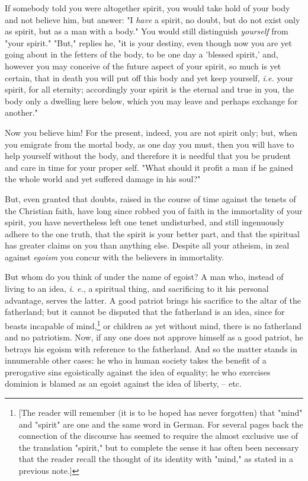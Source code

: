 \documentclass[a4paper]{book}
\begin{document}
If somebody told you were altogether spirit, you would take hold of your body 
and not believe him, but answer: "{}I \textit{have} a spirit, no doubt, but do 
not exist only as spirit, but as a man with a body."{} You would still 
distinguish \textit{yourself} from "{}your spirit."{} "{}But,"{} replies he, 
"{}it is your destiny, even though now you are yet going about in the fetters 
of the body, to be one day a 'blessed spirit,' and, however you may conceive 
of the future aspect of your spirit, so much is yet certain, that in death you 
will put off this body and yet keep yourself, \textit{i.e.} your spirit, for 
all eternity; accordingly your spirit is the eternal and true in you, the body 
only a dwelling here below, which you may leave and perhaps exchange for 
another."{}

Now you believe him! For the present, indeed, you are not spirit only; but, 
when you emigrate from the mortal body, as one day you must, then you will 
have to help yourself without the body, and therefore it is needful that you 
be prudent and care in time for your proper self. "{}What should it profit a 
man if he gained the whole world and yet suffered damage in his soul?"{}

But, even granted that doubts, raised in the course of time against the tenets 
of the Christian faith, have long since robbed you of faith in the immortality 
of your spirit, you have nevertheless left one tenet undisturbed, and still 
ingenuously adhere to the one truth, that the spirit is your better part, and 
that the spiritual has greater claims on you than anything else. Despite all 
your atheism, in zeal against \textit{egoism} you concur with the believers in 
immortality.

But whom do you think of under the name of egoist? A man who, instead of 
living to an idea, \textit{i. e.}, a spiritual thing, and sacrificing to it 
his personal advantage, serves the latter. A good patriot brings his sacrifice 
to the altar of the fatherland; but it cannot be disputed that the fatherland 
is an idea, since for beasts incapable of mind,\footnote{[The reader will 
remember (it is to be hoped has never forgotten) that "{}mind"{} and 
"{}spirit"{} are one and the same word in German. For several pages back the 
connection of the discourse has seemed to require the almost exclusive use of 
the translation "{}spirit,"{} but to complete the sense it has often been 
necessary that the reader recall the thought of its identity with "{}mind,"{} 
as stated in a previous note.]} or children as yet without mind, there is no 
fatherland and no patriotism. Now, if any one does not approve himself as a 
good patriot, he betrays his egoism with reference to the fatherland. And so 
the matter stands in innumerable other cases: he who in human society takes 
the benefit of a prerogative sins egoistically against the idea of equality; 
he who exercises dominion is blamed as an egoist against the idea of liberty, 
-- etc.
\end{document}
